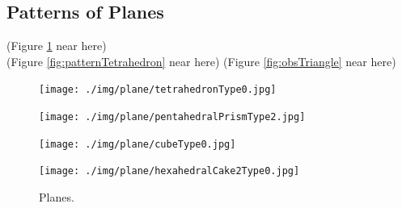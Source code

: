 \documentclass[suppldata, dvipdfmx]{interact}
\theoremstyle{plain}%
\theoremstyle{definition}
\theoremstyle{remark}
\theoremstyle{problemstyle}
\begin{document}
 

\subsection{Patterns of Planes}\label{section:patternsOfPlanes}

\noindent(Figure \ref{fig:planes}
 near here)\\
(Figure \ref{fig:patternTetrahedron} near here)
(Figure \ref{fig:obsTriangle} near here)

\begin{figure}[h!tbp]
  \begin{minipage}[t]{0.23\textwidth}
   \centering
   \texttt{[image: ./img/plane/tetrahedronType0.jpg]}
   \label{fig:planeTetra}
  \end{minipage}
 \hspace*{\fill}
  \begin{minipage}[t]{0.23\textwidth}
   \centering
   \texttt{[image: ./img/plane/pentahedralPrismType2.jpg]}
   \label{fig:planePentaPrism}
  \end{minipage}
 \hspace*{\fill}
  \begin{minipage}[t]{0.23\textwidth}
   \centering
   \texttt{[image: ./img/plane/cubeType0.jpg]}
   \label{fig:planeCube}
  \end{minipage}
  \hspace*{\fill}
  \begin{minipage}[t]{0.23\textwidth}
   \centering
   \texttt{[image: ./img/plane/hexahedralCake2Type0.jpg]}
   \label{fig:planeCake}
  \end{minipage}
 \hspace*{\fill}
 \caption{Planes.}
 \label{fig:planes}
\end{figure}
\end{document}

